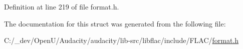 Definition at line 219 of file format.\+h.



The documentation for this struct was generated from the following file\+:\begin{DoxyCompactItemize}
\item 
C\+:/\+\_\+dev/\+Open\+U/\+Audacity/audacity/lib-\/src/libflac/include/\+F\+L\+A\+C/\hyperlink{include_2_f_l_a_c_2format_8h}{format.\+h}\end{DoxyCompactItemize}
